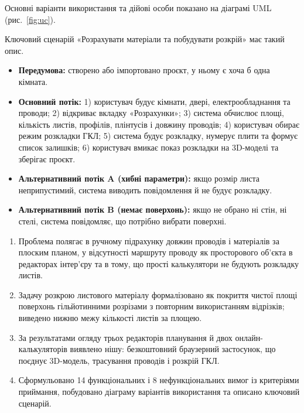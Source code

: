 Основні варіанти використання та дійові особи показано на діаграмі UML~ (рис.~\ref{fig:uc}).


Ключовий сценарій «Розрахувати матеріали та побудувати розкрій» має такий опис.

\begin{itemize}[noitemsep, topsep=0.3em, leftmargin=*]
    \item \textbf{Передумова:} створено або імпортовано проєкт, у ньому є хоча б одна кімната.
    \item \textbf{Основний потік:} 1) користувач будує кімнати, двері, електрообладнання та проводи; 2) відкриває вкладку «Розрахунки»; 3) система обчислює площі, кількість листів, профілів, плінтусів і довжину проводів; 4) користувач обирає режим розкладки ГКЛ; 5) система будує розкладку, нумерує плити та формує список залишків; 6) користувач вмикає показ розкладки на 3D-моделі та зберігає проєкт.
    \item \textbf{Альтернативний потік A (хибні параметри):} якщо розмір листа неприпустимий, система виводить повідомлення й не будує розкладку.
    \item \textbf{Альтернативний потік B (немає поверхонь):} якщо не обрано ні стін, ні стелі, система повідомляє, що потрібно вибрати поверхні.
\end{itemize}


\begin{enumerate}[noitemsep, topsep=0.3em, leftmargin=*, label=\arabic*.]
    \item Проблема полягає в ручному підрахунку довжин проводів і матеріалів за плоским планом, у відсутності маршруту проводу як просторового об'єкта в редакторах інтер'єру та в тому, що прості калькулятори не будують розкладку листів.
    \item Задачу розкрою листового матеріалу формалізовано як покриття чистої площі поверхонь гільйотинними розрізами з повторним використанням відрізків; виведено нижню межу кількості листів за площею.
    \item За результатами огляду трьох редакторів планування й двох онлайн-калькуляторів виявлено нішу: безкоштовний браузерний застосунок, що поєднує 3D-модель, трасування проводів і розкрій ГКЛ.
    \item Сформульовано 14 функціональних і 8 нефункціональних вимог із критеріями приймання, побудовано діаграму варіантів використання та описано ключовий сценарій.
\end{enumerate}
